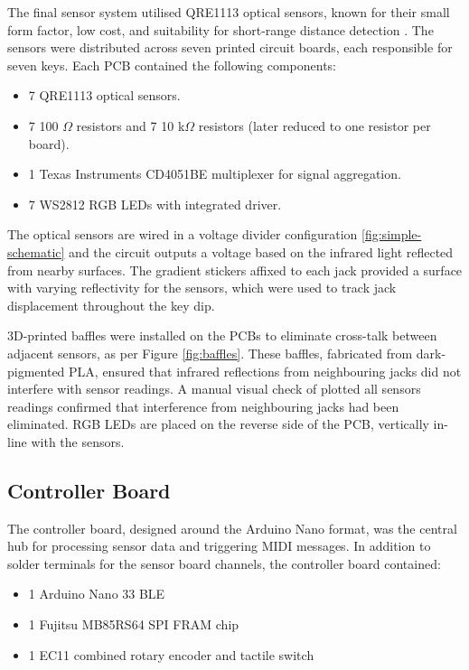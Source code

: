 The final sensor system utilised QRE1113 optical sensors, known for their small form factor, low cost, and suitability for short-range distance detection \cite{McPherson2013, McPherson2019}. The sensors were distributed across seven printed circuit boards, each responsible for seven keys. Each PCB contained the following components:

\begin{itemize}
    \item 7 QRE1113 optical sensors.
    \item 7 100 $\Omega$ resistors and 7 10 k$\Omega$ resistors (later reduced to one resistor per board).
    \item 1 Texas Instruments CD4051BE multiplexer for signal aggregation.
    \item 7 WS2812 RGB LEDs with integrated driver.
\end{itemize}

The optical sensors are wired in a voltage divider configuration \ref{fig:simple-schematic} and the circuit outputs a voltage based on the infrared light reflected from nearby surfaces. 
The gradient stickers affixed to each jack provided a surface with varying reflectivity for the sensors, which were used to track jack displacement throughout the key dip. 

3D-printed baffles were installed on the PCBs to eliminate cross-talk between adjacent sensors, as per Figure \ref{fig:baffles}. These baffles, fabricated from dark-pigmented PLA, ensured that infrared reflections from neighbouring jacks did not interfere with sensor readings. A manual visual check of plotted all sensors readings confirmed that interference from neighbouring jacks had been eliminated. RGB LEDs are placed on the reverse side of the PCB, vertically in-line with the sensors.

\subsection{Controller Board}\label{controller-board}

The controller board, designed around the Arduino Nano format, was the central hub for processing sensor data and triggering MIDI messages. In addition to solder terminals for the sensor board channels, the controller board contained:

\begin{itemize}
    \item 1 Arduino Nano 33 BLE
    \item 1 Fujitsu MB85RS64 SPI FRAM chip
    \item 1 EC11 combined rotary encoder and tactile switch
\end{itemize}

